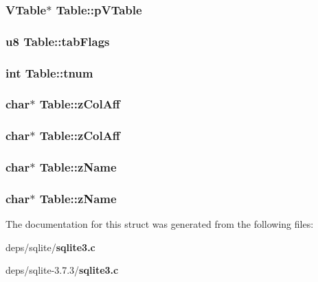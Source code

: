 \subsubsection{\setlength{\rightskip}{0pt plus 5cm}\bf{VTable}$\ast$ \bf{Table::p\-VTable}}\label{structTable_f228a11961b4a4a2fab3b0a106318aae}


\subsubsection{\setlength{\rightskip}{0pt plus 5cm}\bf{u8} \bf{Table::tab\-Flags}}\label{structTable_38d7404be669e3bcba25ad7bfc062cf3}


\subsubsection{\setlength{\rightskip}{0pt plus 5cm}int \bf{Table::tnum}}\label{structTable_2e5b237f6d9e4d152558565ec686ce25}


\subsubsection{\setlength{\rightskip}{0pt plus 5cm}char$\ast$ \bf{Table::z\-Col\-Aff}}\label{structTable_8b465f9180fc615e6c702b283c64e428}


\subsubsection{\setlength{\rightskip}{0pt plus 5cm}char$\ast$ \bf{Table::z\-Col\-Aff}}\label{structTable_8b465f9180fc615e6c702b283c64e428}


\subsubsection{\setlength{\rightskip}{0pt plus 5cm}char$\ast$ \bf{Table::z\-Name}}\label{structTable_0518649cef39d55a334b910c850351b0}


\subsubsection{\setlength{\rightskip}{0pt plus 5cm}char$\ast$ \bf{Table::z\-Name}}\label{structTable_0518649cef39d55a334b910c850351b0}




The documentation for this struct was generated from the following files:\begin{CompactItemize}
\item 
deps/sqlite/\bf{sqlite3.c}\item 
deps/sqlite-3.7.3/\bf{sqlite3.c}\end{CompactItemize}
